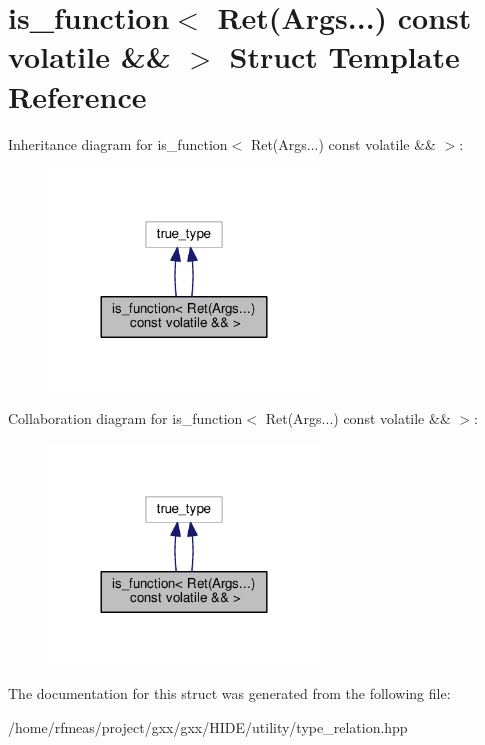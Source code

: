 \hypertarget{structis__function_3_01Ret_07Args_8_8_8_08_01const_01volatile_01_6_6_01_4}{}\section{is\+\_\+function$<$ Ret(Args...) const volatile \&\& $>$ Struct Template Reference}
\label{structis__function_3_01Ret_07Args_8_8_8_08_01const_01volatile_01_6_6_01_4}


Inheritance diagram for is\+\_\+function$<$ Ret(Args...) const volatile \&\& $>$\+:
\nopagebreak
\begin{figure}[H]
\begin{center}
\leavevmode
\includegraphics[width=204pt]{structis__function_3_01Ret_07Args_8_8_8_08_01const_01volatile_01_6_6_01_4__inherit__graph}
\end{center}
\end{figure}


Collaboration diagram for is\+\_\+function$<$ Ret(Args...) const volatile \&\& $>$\+:
\nopagebreak
\begin{figure}[H]
\begin{center}
\leavevmode
\includegraphics[width=204pt]{structis__function_3_01Ret_07Args_8_8_8_08_01const_01volatile_01_6_6_01_4__coll__graph}
\end{center}
\end{figure}


The documentation for this struct was generated from the following file\+:\begin{DoxyCompactItemize}
\item 
/home/rfmeas/project/gxx/gxx/\+H\+I\+D\+E/utility/type\+\_\+relation.\+hpp\end{DoxyCompactItemize}
